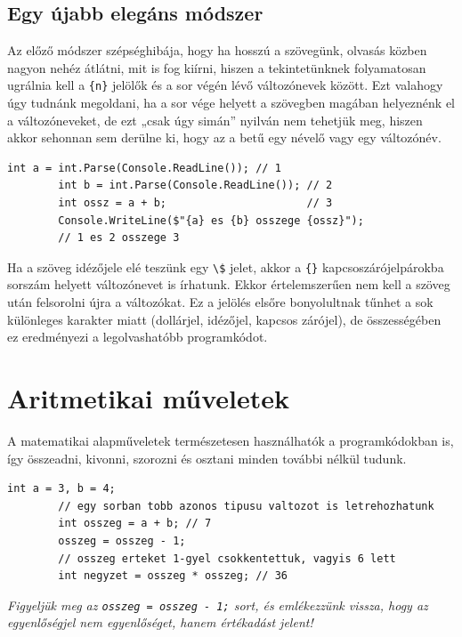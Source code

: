 \documentclass[a4paper]{article}
\begin{document}
	\subsection{Egy újabb elegáns módszer}
	Az előző módszer szépséghibája, hogy ha hosszú a szövegünk, olvasás közben nagyon nehéz átlátni, mit is fog kiírni, hiszen a tekintetünknek folyamatosan ugrálnia kell a \lstinline!{n}! jelölők és a sor végén lévő változónevek között. Ezt valahogy úgy tudnánk megoldani, ha a sor vége helyett a szövegben magában helyeznénk el a változóneveket, de ezt „csak úgy simán” nyilván nem tehetjük meg, hiszen akkor sehonnan sem derülne ki, hogy az a betű egy névelő vagy egy változónév.
	
	\begin{lstlisting}[caption=Változók értékének kiírása -- elegánsan 2., label=lst:writeVarsElegant2]
		int a = int.Parse(Console.ReadLine()); // 1
		int b = int.Parse(Console.ReadLine()); // 2
		int ossz = a + b;                      // 3
		Console.WriteLine($"{a} es {b} osszege {ossz}");
		// 1 es 2 osszege 3
	\end{lstlisting}
	
	\newcommand{\within}[1]{#1}
	
	Ha a szöveg idézőjele elé teszünk egy \within{\lstinline{\$}} jelet, akkor a \lstinline!{}! kapcsoszárójelpárokba sorszám helyett változónevet is írhatunk. Ekkor értelemszerűen nem kell a szöveg után felsorolni újra a változókat. Ez a jelölés elsőre bonyolultnak tűnhet a sok különleges karakter miatt (dollárjel, idézőjel, kapcsos zárójel), de összességében ez eredményezi a legolvashatóbb programkódot.
	
	\section{Aritmetikai műveletek}
	A matematikai alapműveletek természetesen használhatók a programkódokban is, így összeadni, kivonni, szorozni és osztani minden további nélkül tudunk.
	
	\begin{lstlisting}[caption=Aritmetikai műveletek, label=lst:arithemtics]
		int a = 3, b = 4;
		// egy sorban tobb azonos tipusu valtozot is letrehozhatunk
		int osszeg = a + b; // 7
		osszeg = osszeg - 1;
		// osszeg erteket 1-gyel csokkentettuk, vagyis 6 lett
		int negyzet = osszeg * osszeg; // 36
	\end{lstlisting}
	
	\emph{Figyeljük meg az \lstinline{osszeg = osszeg - 1;} sort, és emlékezzünk vissza, hogy az egyenlőségjel nem egyenlőséget, hanem értékadást jelent!}
	
\end{document}
